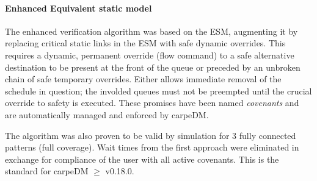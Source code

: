 \paragraph{Enhanced Equivalent static model}
The enhanced verification algorithm was based on the ESM, augmenting it by replacing critical static links in the ESM with safe dynamic overrides. This requires a dynamic, permanent override (flow command) to a safe alternative destination to be present at the front of the queue or preceded by an unbroken chain of safe temporary overrides. Either allows immediate removal of the schedule in question; the involded queues must not be preempted until the crucial override to safety is executed. These promises have been named \emph{covenants} and are automatically managed and enforced by carpeDM.
\par The algorithm was also proven to be valid by simulation for 3 fully connected patterns (full coverage). Wait times from the first approach were eliminated in exchange for compliance of the user with all active covenants.
This is the standard for carpeDM $\ge$ v0.18.0.



